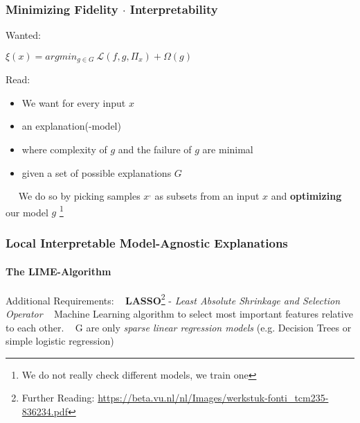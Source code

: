 \begin{frame}
	\frametitle{Minimizing Fidelity $\cdot$ Interpretability}
	\begin{Large}
		Wanted: ~\newline
		\begin{center}
			$\xi(x) = argmin_{g\in G} ~ \mathcal{L}(f,g,\Pi_x) + \Omega(g)$
		\end{center}
		Read: 
		\begin{itemize}
			\item We want for every input $x$
			\item an explanation(-model)
			\item where complexity of $g$ and the failure of $g$ are minimal
			\item given a set of possible explanations $G$
		\end{itemize}
	\end{Large}
~\newline ~\newline 
We do so by picking samples $x^,$ as subsets from an input $x$ and \textbf{optimizing} our model $g$ \footnote{We do not really check different models, we train one} 
\end{frame}

\begin{frame}
	\frametitle{Local Interpretable Model-Agnostic Explanations}
	\framesubtitle{The LIME-Algorithm}
	Additional Requirements: ~\newline 
	\textbf{LASSO}\footnote{Further Reading: \url{https://beta.vu.nl/nl/Images/werkstuk-fonti_tcm235-836234.pdf}} - \textit{Least Absolute Shrinkage and Selection Operator} ~\newline 
	Machine Learning algorithm to select most important features relative to each other. ~\newline
	G are only \textit{sparse linear regression models} (e.g. Decision Trees or simple logistic regression) ~\newline 
	

\end{frame}